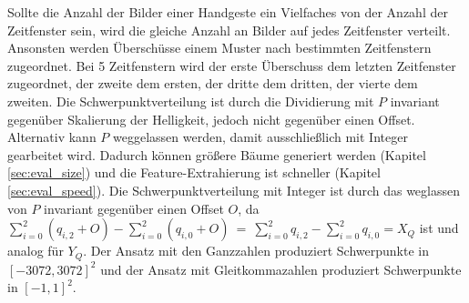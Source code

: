 Sollte die Anzahl der Bilder einer Handgeste ein Vielfaches von der Anzahl der Zeitfenster sein, wird die gleiche Anzahl an Bilder auf jedes Zeitfenster verteilt. Ansonsten werden Überschüsse einem Muster
nach bestimmten Zeitfenstern zugeordnet. Bei 5 Zeitfenstern wird der erste Überschuss dem letzten Zeitfenster zugeordnet, der zweite dem ersten, der dritte dem dritten, der vierte dem zweiten.
\newline
\newline
Die Schwerpunktverteilung ist durch die Dividierung mit $P$ invariant gegenüber Skalierung der Helligkeit, jedoch nicht gegenüber einen Offset. Alternativ kann $P$ weggelassen werden, damit ausschließlich
mit Integer gearbeitet wird. Dadurch können größere Bäume generiert werden (Kapitel \ref{sec:eval_size}) und die Feature-Extrahierung ist schneller (Kapitel \ref{sec:eval_speed}). Die Schwerpunktverteilung
mit Integer ist durch das weglassen von $P$ invariant gegenüber einen Offset $O$, da $\sum_{i=0}^{2}(q_{i,2} + O) - \sum_{i=0}^{2}(q_{i,0} + O)\ =\ \sum_{i=0}^{2} q_{i,2} - \sum_{i=0}^{2} q_{i,0} = X_Q$ ist und analog
für $Y_Q$. Der Ansatz mit den Ganzzahlen produziert Schwerpunkte in $[-3072, 3072]^2$ und der Ansatz mit Gleitkommazahlen produziert Schwerpunkte in $[-1, 1]^2$.
